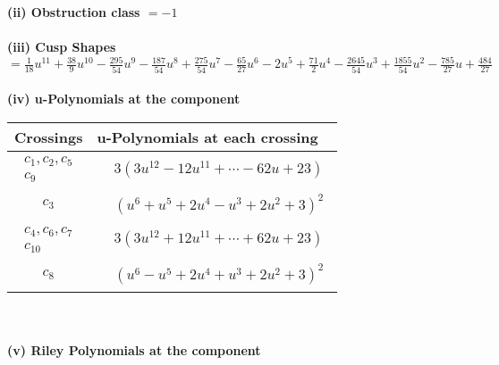 \documentclass[1p]{elsarticle_modified}
\theoremstyle{definition}
\begin{document}
\flushleft \textbf{(ii) Obstruction class $= -1$}\\~\\
\flushleft \textbf{(iii) Cusp Shapes $= \frac{1}{18} u^{11}+\frac{38}{9} u^{10}-\frac{295}{54} u^9-\frac{187}{54} u^8+\frac{275}{54} u^7-\frac{65}{27} u^6-2 u^5+\frac{71}{2} u^4-\frac{2645}{54} u^3+\frac{1855}{54} u^2-\frac{785}{27} u+\frac{484}{27}$}\\~\\
\newpage\renewcommand{\arraystretch}{1}
\flushleft \textbf{(iv) u-Polynomials at the component}\newline \\
\begin{tabular}{m{50pt}|m{274pt}}
Crossings & \hspace{64pt}u-Polynomials at each crossing \\
\hline $$\begin{aligned}c_{1},c_{2},c_{5}\\c_{9}\end{aligned}$$&$\begin{aligned}
&3(3 u^{12}-12 u^{11}+\cdots-62 u+23)
\end{aligned}$\\
\hline $$\begin{aligned}c_{3}\end{aligned}$$&$\begin{aligned}
&(u^6+u^5+2 u^4- u^3+2 u^2+3)^2
\end{aligned}$\\
\hline $$\begin{aligned}c_{4},c_{6},c_{7}\\c_{10}\end{aligned}$$&$\begin{aligned}
&3(3 u^{12}+12 u^{11}+\cdots+62 u+23)
\end{aligned}$\\
\hline $$\begin{aligned}c_{8}\end{aligned}$$&$\begin{aligned}
&(u^6- u^5+2 u^4+u^3+2 u^2+3)^2
\end{aligned}$\\
\hline
\end{tabular}\\~\\
\newpage\renewcommand{\arraystretch}{1}
\flushleft \textbf{(v) Riley Polynomials at the component}\newline \\
\end{document}
